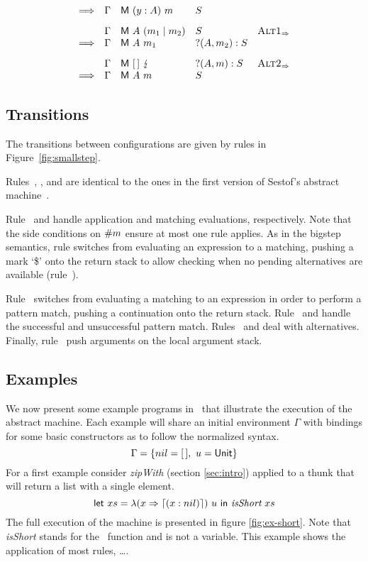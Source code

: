 \begin{figure*}
\[\begin{array}{rllll}
      \Longrightarrow & \Gamma & \textsf{M}~(y:A)~m  & S \\[2ex]
      & \Gamma & \textsf{M}~A~(m_1 \mid m_2) & S & \textsc{Alt1}_{\Rightarrow} \\
      \Longrightarrow & \Gamma & \textsf{M}~A~m_1   &?(A,m_2):S & \\[2ex]
  & \Gamma & \textsf{M}~[\,]~\lightning  & ?(A,m):S & \textsc{Alt2}_{\Rightarrow} \\
  \Longrightarrow & \Gamma & \textsf{M}~A~m  & S 
    \end{array}
  \]
    
  
  \caption{Abstract machine transition rules}\label{fig:smallstep}
\end{figure*}

\subsection{Transitions}

The transitions between configurations are given by rules in
Figure~\ref{fig:smallstep}.

Rules~, , 
and  are identical to the ones in the first version of
Sestof's abstract machine~\cite{sestof_1997}.

Rule~ and  handle application
and matching evaluations, respectively. Note that the
side conditions on $\#{m}$ ensure at most one
rule applies.
As in the bigstep semantics, rule  switches
from evaluating an expression to a
matching, pushing a mark `\$' onto the return stack
to allow checking when no pending alternatives
are available (rule~).

Rule~ switches from evaluating a matching
to an expression in order to perform a pattern match, pushing
a continuation onto the return stack.
Rule~ and  handle
the successful and unsuccessful pattern match.
Rules~ and  deal
with alternatives.
Finally, rule~ push arguments on the local argument stack.

\subsection{Examples}

We now present some example programs in \lambdaPMC\ that illustrate the execution of the abstract machine.
Each example will share an initial environment $\Gamma$ with bindings for some basic constructors as to follow the normalized syntax.
\[
  \Gamma = \{ nil = [\,],\ u = \textsf{Unit} \}   
\]
For a first example consider \textit{zipWith} (section \ref{sec:intro}) applied to a thunk that will return a list with a single element.
\[
  \textsf{let}~xs = \lambda(x \Rightarrow \left\lceil (x : nil)\right\rceil)~u~\textsf{in}~\textit{isShort}~xs
\]
The full execution of the machine is presented in figure \ref{fig:ex-short}.
Note that \textit{isShort} stands for the \lambdaPMC\ function and is not a variable.
This example shows the application of most rules, \dots.

